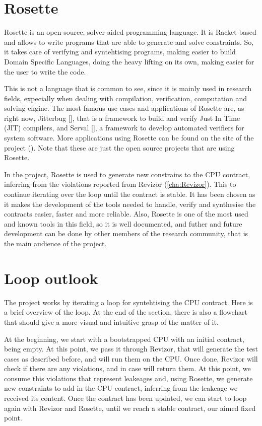 \section{Rosette}
\label{cha:Rosette} Rosette is an open-source, solver-aided programming language.
It is Racket-based and allows to write programs that are able to generate and
solve constraints. So, it takes care of verifying and syntehtising programs, making
easier to build Domain Specific Languages, doing the heavy lifting on its own, making
easier for the user to write the code.

This is not a language that is common to see, since it is mainly used in
research fields, expecially when dealing with compilation, verification, computation
and solving engine. The most famous use cases and applications of Rosette are, as
right now, Jitterbug [\cite{jit}], that is a framework to build and verify Just In
Time (JIT) compilers, and Serval [\cite{ser}], a framework to develop automated verifiers
for system software. More applications using Rosette can be found on the site of
the project (\cite{ros}). Note that these are just the open source projects that
are using Rosette.

In the project, Rosette is used to generate new constrains to the CPU contract, inferring
from the violations reported from Revizor (\ref{cha:Revizor}). This to continue
iterating over the loop until the contract is stable. It has been chosen as it makes
the development of the tools needed to handle, verify and synthesise the
contracts easier, faster and more reliable. Also, Rosette is one of the most used
and known tools in this field, so it is well documented, and futher and future development
can be done by other members of the research community, that is the main
audience of the project.

\section{Loop outlook}
\label{cha: Loop outlook} The project works by iterating a loop for syntehtising
the CPU contract. Here is a brief overview of the loop. At the end of the
section, there is also a flowchart that should give a more visual and intuitive grasp
of the matter of it.

At the beginning, we start with a bootstrapped CPU with an initial contract, being
empty. At this point, we pass it through Revizor, that will generate the test
cases as described before, and will run them on the CPU. Once done, Revizor will
check if there are any violations, and in case will return them. At this point,
we consume this violations that represent leakeages and, using Rosette, we
generate new constraints to add in the CPU contract, inferring from the leakeage
we received its content. Once the contract has been updated, we can start to loop
again with Revizor and Rosette, until we reach a stable contract, our aimed fixed
point.

